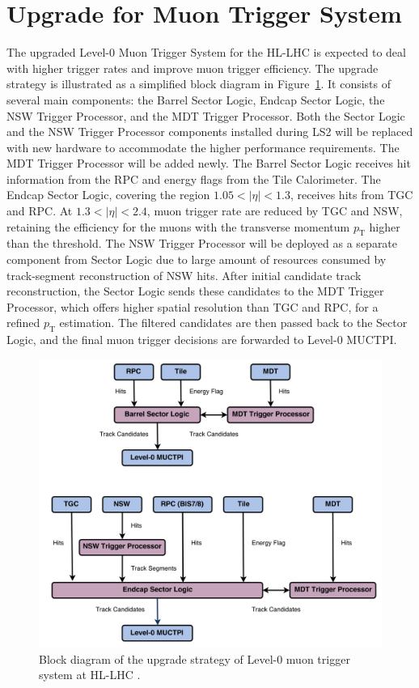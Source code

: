 \section{Upgrade for Muon Trigger System} \label{sec:MuonTriggerUpgrade}
The upgraded Level-0 Muon Trigger System for the HL-LHC is expected to deal with higher trigger rates and improve muon trigger efficiency. The upgrade strategy is illustrated as a simplified block diagram in Figure~\ref{fig:muon_trigger_upgrade}. It consists of several main components: the Barrel Sector Logic, Endcap Sector Logic, the NSW Trigger Processor, and the MDT Trigger Processor. Both the Sector Logic and the NSW Trigger Processor components installed during LS2 will be replaced with new hardware to accommodate the higher performance requirements. The MDT Trigger Processor will be added newly. The Barrel Sector Logic receives hit information from the RPC and energy flags from the Tile Calorimeter. The Endcap Sector Logic, covering the region $1.05 < |\eta| < 1.3$, receives hits from TGC and RPC. At $1.3 < |\eta| < 2.4$, muon trigger rate are reduced by TGC and NSW, retaining the efficiency for the muons with the transverse momentum $p_\mathrm{T}$ higher than the threshold. The NSW Trigger Processor will be deployed as a separate component from Sector Logic due to large amount of resources consumed by track-segment reconstruction of NSW hits. After initial candidate track reconstruction, the Sector Logic sends these candidates to the MDT Trigger Processor, which offers higher spatial resolution than TGC and RPC, for a refined $p_\mathrm{T}$ estimation. The filtered candidates are then passed back to the Sector Logic, and the final muon trigger decisions are forwarded to Level-0 MUCTPI.

\begin{figure}[htbp]
  \centering
  \includegraphics[width=1.0\textwidth]{figs/chapter2/muon_trigger_upgrade.png}
  \caption{Block diagram of the upgrade strategy of Level-0 muon trigger system at HL-LHC \cite{TDAQ_TDR}.}
  \label{fig:muon_trigger_upgrade}
\end{figure}
